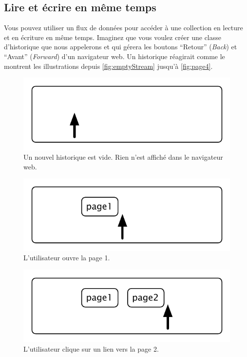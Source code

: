 \documentclass[a4paper,10pt,twoside]{book}
\begin{document}
\subsection{Lire et \'ecrire en m\^eme temps}

Vous pouvez utiliser un flux de donn\'ees pour acc\'eder \`a une collection
en lecture et en \'ecriture en m\^eme temps.
Imaginez que vous voulez cr\'eer une classe d'historique que nous appelerons  et qui g\'erera
les boutons ``Retour'' (\emph{Back}) et ``Avant'' (\emph{Forward}) d'un
navigateur web.
Un historique r\'eagirait comme le montrent les illustrations depuis \ref{fig:emptyStream} jusqu'\`a \ref{fig:page4}.

\begin{figure}[!ht]
\centerline{\includegraphics[scale=0.5]{emptyStef}}
\caption{Un nouvel historique est vide. Rien n'est affich\'e dans le navigateur web.}
\vspace{.2in}
\end{figure}

\begin{figure}[!ht]
\centerline{\includegraphics[scale=0.5]{page1Stef}}
\caption{L'utilisateur ouvre la page 1.}
\vspace{.2in}
\end{figure}

\begin{figure}[!ht]
\centerline{\includegraphics[scale=0.5]{page2Stef}}
\caption{L'utilisateur clique sur un lien vers la page 2.}
\vspace{.2in}
\end{figure}
\end{document}
